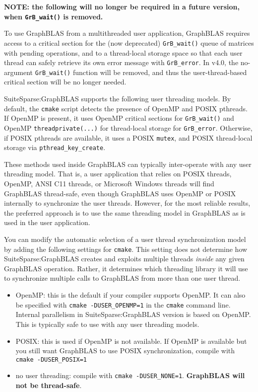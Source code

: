 \documentclass[12pt]{article}
\begin{document}
{\bf NOTE: the following will no longer be required in a future version,
when \verb'GrB_wait()' is removed.}

To use GraphBLAS from a multithreaded user application, GraphBLAS requires
access to a critical section for the (now deprecated) \verb'GrB_wait()' queue
of matrices with pending operations, and to a thread-local storage space so
that each user thread can safely retrieve its own error message with
\verb'GrB_error'.  In v4.0, the no-argument \verb'GrB_wait()' function will be
removed, and thus the user-thread-based critical section will be no longer
needed.

SuiteSparse:GraphBLAS supports the following user threading models.  By
default, the \verb'cmake' script detects the presence of OpenMP and POSIX
pthreads.  If OpenMP is present, it uses OpenMP critical sections for
\verb'GrB_wait()' and OpenMP \verb'threadprivate(...)' for thread-local storage
for \verb'GrB_error'.  Otherwise, if POSIX pthreads are available, it uses a
POSIX \verb'mutex', and POSIX thread-local storage via
\verb'pthread_key_create'.

These methods used inside GraphBLAS can typically inter-operate with any user
threading model.  That is, a user application that relies on POSIX threads,
OpenMP, ANSI C11 threads, or Microsoft Windows threads will find GraphBLAS
thread-safe, even though GraphBLAS uses OpenMP or POSIX internally to
synchronize the user threads.  However, for the most reliable results, the
preferred approach is to use the same threading model in GraphBLAS as is used
in the user application.

You can modify the automatic selection of a user thread synchronization model
by adding the following settings for \verb'cmake'.  This setting does not
determine how SuiteSparse:GraphBLAS creates and exploits multiple threads {\em
inside} any given GraphBLAS operation. Rather, it determines which threading
library it will use to synchronize multiple calls to GraphBLAS from more than
one user thread.

\begin{itemize}
\item OpenMP: this is the default if your compiler supports OpenMP.
    It can also be specified with \verb'cmake -DUSER_OPENMP=1' in the
    \verb'cmake' command line.  Internal parallelism in
    SuiteSparse:GraphBLAS version is based on OpenMP.  This is
    typically safe to use with any user threading models.

\item POSIX: this is used if OpenMP is not available.
    If OpenMP is available but you still want GraphBLAS to use POSIX
    synchronization, compile with \verb'cmake -DUSER_POSIX=1'

\item no user threading:  compile with \verb'cmake -DUSER_NONE=1'.
    {\bf GraphBLAS will not be thread-safe}.

\end{itemize}
\end{document}
